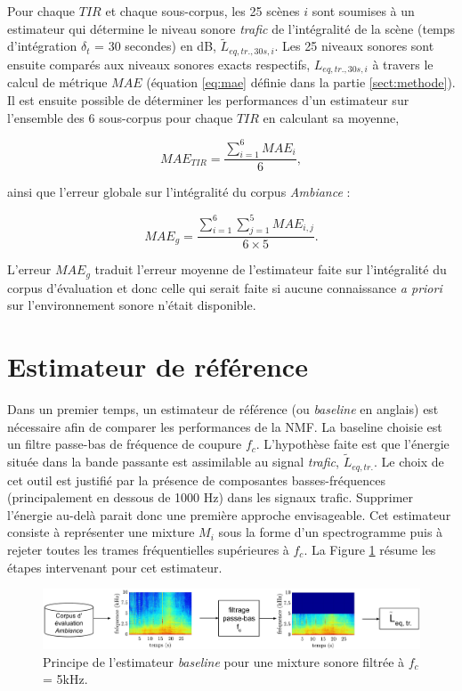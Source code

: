 Pour chaque $TIR$ et chaque sous-corpus, les 25 scènes $i$ sont soumises à un estimateur qui détermine le niveau sonore \textit{trafic} de l'intégralité de la scène (temps d'intégration $\delta_t$ = 30 secondes) en dB,  $\tilde{L}_{eq,tr.,30s,i}$. Les 25 niveaux sonores sont ensuite comparés aux niveaux sonores exacts respectifs, $L_{eq,tr.,30s,i}$ à travers le calcul de métrique $MAE$ (équation \ref{eq:mae} définie dans la partie \ref{sect:methode}). Il est ensuite possible de déterminer les performances d'un estimateur sur l'ensemble des 6 sous-corpus pour chaque $TIR$ en calculant sa moyenne, 

\begin{equation}\label{eq:mae_tir}
MAE_{TIR} = \frac{\sum_{i = 1}^6 MAE_{i}}{6},
\end{equation}

ainsi que l'erreur globale sur l'intégralité du corpus \textit{Ambiance} :

\begin{equation}\label{eq:mae_g}
MAE_{g} = \frac{\sum_{i = 1}^6 \sum_{j = 1}^5 MAE_{i,j}}{6 \times 5}.
\end{equation}

L'erreur $MAE_g$ traduit l'erreur moyenne de l'estimateur faite sur l'intégralité du corpus d'évaluation et donc celle qui serait faite si aucune connaissance \textit{a priori} sur l'environnement sonore n'était disponible.

\section{Estimateur de référence}
Dans un premier temps, un estimateur de référence (ou \textit{baseline} en anglais) est nécessaire afin de comparer les performances de la NMF. La baseline choisie est un filtre passe-bas de fréquence de coupure $f_c$. L'hypothèse faite est que l'énergie située dans la bande passante est assimilable au signal \textit{trafic}, $\tilde{L}_{eq,tr.}$. Le choix de cet outil est justifié par la présence de composantes basses-fréquences (principalement en dessous de 1000 Hz) dans les signaux trafic. Supprimer l'énergie au-delà parait donc une première approche envisageable. %
Cet estimateur consiste à représenter une mixture $M_i$ sous la forme d'un spectrogramme puis à rejeter toutes les trames fréquentielles supérieures à $f_c$. La Figure \ref{fig:baseline} résume les étapes intervenant pour cet estimateur.

\begin{figure}[hbtp]
\centering
\includegraphics[width=\linewidth]{./figures/NMF/filtre_principe.pdf}
\caption{Principe de l'estimateur \textit{baseline}  pour une mixture sonore filtrée à $f_c$ = 5kHz.}
\label{fig:baseline}
\end{figure}

